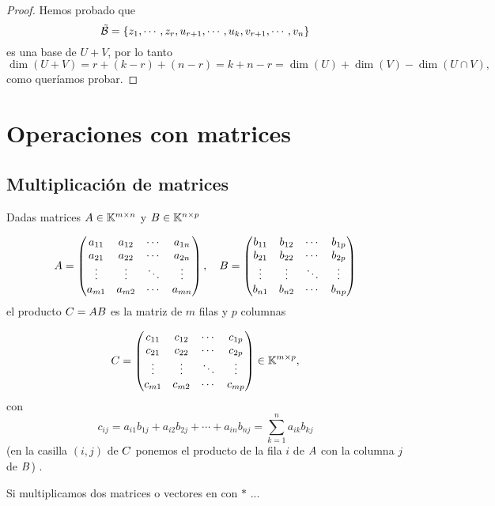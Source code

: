 \begin{proof}
  Hemos probado que
  $$\tilde{\B}=\{\zb_1,\cdots,\zb_r,\ub_{r+1},\cdots, \ub_k, \vb_{r+1},\cdots, \vb_n\}$$
  es una base de $U+V$, por lo tanto
  $$\dim(U+V)=r+(k-r)+(n-r)=k+n-r=\dim(U)+\dim(V)-\dim(U\cap V),$$
  como queríamos probar. \end{proof} 
  
  
\section{Operaciones con matrices}

\subsection{Multiplicación de matrices}

Dadas matrices $A \in \mathbb K^{m \times n}$ y $B \in \mathbb K^{n \times p}$

$$
\Ab =\begin{pmatrix}a_{11}&a_{12}&\cdots &a_{1n}\\a_{21}&a_{22}&\cdots &a_{2n}\\\vdots &\vdots &\ddots &\vdots \\a_{m1}&a_{m2}&\cdots &a_{mn}\\\end{pmatrix},\quad  {\Bb} ={\begin{pmatrix}b_{11}&b_{12}&\cdots &b_{1p}\\b_{21}&b_{22}&\cdots &b_{2p}\\\vdots &\vdots &\ddots &\vdots \\b_{n1}&b_{n2}&\cdots &b_{np}\\\end{pmatrix}}
$$ el producto $\Cb = \Ab\Bb$ es la matriz de $m$ filas y $p$ columnas

$$
\Cb =\begin{pmatrix}c_{11}&c_{12}&\cdots &c_{1p}\\c_{21}&c_{22}&\cdots &c_{2p}\\\vdots &\vdots &\ddots &\vdots \\c_{m1}&c_{m2}&\cdots &c_{mp}\\\end{pmatrix} \in \K^{m \times p},
$$
con
$$
c_{ij}=a_{i1}b_{1j}+a_{i2}b_{2j}+\cdots +a_{in}b_{nj}=\sum _{k=1}^{n}a_{ik}b_{kj}
$$
(en la casilla $(i,j)$ de $\Cb$ ponemos el producto de la fila $i$ de $\Ab$ con la columna $j$ de $\Bb$) .


Si multiplicamos dos matrices o vectores en \python con $*$ ...

